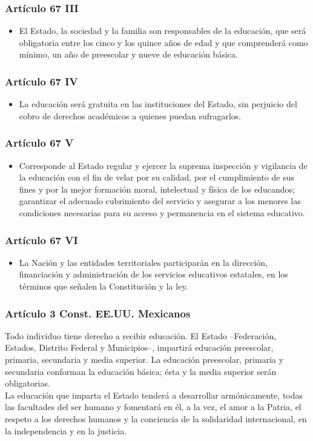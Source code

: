 \documentclass{beamer}
\begin{document}
\begin{frame}
\frametitle{Art\'iculo 67 III}
\begin{itemize}
\item El Estado, la sociedad y la familia son responsables de la educaci\'on, que ser\'a obligatoria entre los cinco y los quince años de edad y que comprender\'a como m\'inimo, un a\~no de preescolar y nueve de educación b\'asica.
\end{itemize}
\end{frame}

\begin{frame}
\frametitle{Art\'iculo 67 IV}
\begin{itemize}
\item La educaci\'on ser\'a gratuita en las instituciones del Estado, sin perjuicio del cobro de derechos académicos a quienes puedan sufragarlos.
\end{itemize}
\end{frame}
\begin{frame}
\frametitle{Art\'iculo 67 V}
\begin{itemize}
\item Corresponde al Estado regular y ejercer la suprema inspección y vigilancia de la educaci\'on con el fin de velar por su calidad, por el cumplimiento de sus fines y por la mejor formaci\'on moral, intelectual y f\'isica de los educandos; garantizar el adecuado cubrimiento del servicio y asegurar a los menores las condiciones necesarias para su acceso y permanencia en el sistema educativo. 
\end{itemize}
\end{frame}

\begin{frame}
\frametitle{Art\'iculo 67 VI}
\begin{itemize}
\item La Naci\'on y las entidades territoriales participar\'an en la direcci\'on, financiaci\'on y administraci\'on de los servicios educativos estatales, en los t\'erminos que se\~nalen la Constituci\'on y la ley. 
\end{itemize}
\end{frame}

\begin{frame}
\frametitle{Art\'iculo 3 Const. EE.UU. Mexicanos}
 Todo individuo tiene derecho a recibir educaci\'on. El Estado –Federaci\'on, Estados, Distrito Federal y Municipios–, impartir\'a educaci\'on preescolar, primaria, secundaria y media superior. La educación preescolar, primaria y secundaria conforman la educaci\'on b\'asica; \'esta y la media superior serán obligatorias.\\
 La educaci\'on que imparta el Estado tenderá a desarrollar arm\'onicamente, todas las facultades del ser humano y fomentar\'a en \'el, a la vez, el amor a la Patria, el respeto a los derechos humanos y la conciencia de la solidaridad internacional, en la independencia y en la justicia.
\end{frame}
\end{document}
